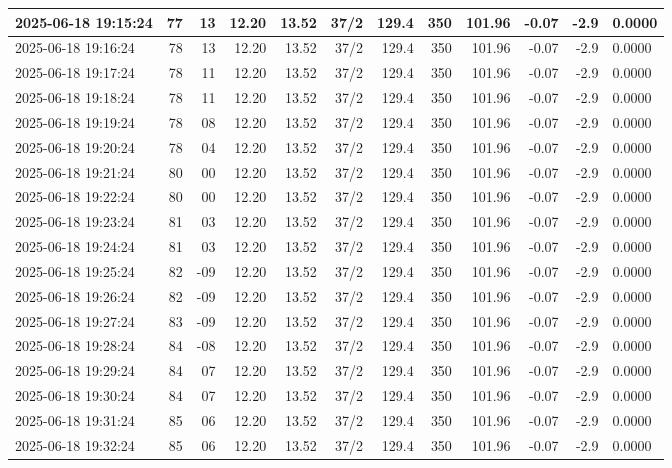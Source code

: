 \documentclass[UTF8,10pt,a4paper,fontset=fandol]{ctexart}
\begin{document}
{\begin{minipage}{0.96\textheight}
\begin{tabular}{|p{2.05cm}|r|r|r|r|r|r|r|r|r|r|p{2.0cm}|}
2025-06-18 19:15:24 & 77 & 13 & 12.20 & 13.52 & 37/2 & 129.4 & 350 & 101.96 & -0.07 & -2.9 & 0.0000 \\ \hline
2025-06-18 19:16:24 & 78 & 13 & 12.20 & 13.52 & 37/2 & 129.4 & 350 & 101.96 & -0.07 & -2.9 & 0.0000 \\ \hline
2025-06-18 19:17:24 & 78 & 11 & 12.20 & 13.52 & 37/2 & 129.4 & 350 & 101.96 & -0.07 & -2.9 & 0.0000 \\ \hline
2025-06-18 19:18:24 & 78 & 11 & 12.20 & 13.52 & 37/2 & 129.4 & 350 & 101.96 & -0.07 & -2.9 & 0.0000 \\ \hline
2025-06-18 19:19:24 & 78 & 08 & 12.20 & 13.52 & 37/2 & 129.4 & 350 & 101.96 & -0.07 & -2.9 & 0.0000 \\ \hline
2025-06-18 19:20:24 & 78 & 04 & 12.20 & 13.52 & 37/2 & 129.4 & 350 & 101.96 & -0.07 & -2.9 & 0.0000 \\ \hline
2025-06-18 19:21:24 & 80 & 00 & 12.20 & 13.52 & 37/2 & 129.4 & 350 & 101.96 & -0.07 & -2.9 & 0.0000 \\ \hline
2025-06-18 19:22:24 & 80 & 00 & 12.20 & 13.52 & 37/2 & 129.4 & 350 & 101.96 & -0.07 & -2.9 & 0.0000 \\ \hline
2025-06-18 19:23:24 & 81 & 03 & 12.20 & 13.52 & 37/2 & 129.4 & 350 & 101.96 & -0.07 & -2.9 & 0.0000 \\ \hline
2025-06-18 19:24:24 & 81 & 03 & 12.20 & 13.52 & 37/2 & 129.4 & 350 & 101.96 & -0.07 & -2.9 & 0.0000 \\ \hline
2025-06-18 19:25:24 & 82 & -09 & 12.20 & 13.52 & 37/2 & 129.4 & 350 & 101.96 & -0.07 & -2.9 & 0.0000 \\ \hline
2025-06-18 19:26:24 & 82 & -09 & 12.20 & 13.52 & 37/2 & 129.4 & 350 & 101.96 & -0.07 & -2.9 & 0.0000 \\ \hline
2025-06-18 19:27:24 & 83 & -09 & 12.20 & 13.52 & 37/2 & 129.4 & 350 & 101.96 & -0.07 & -2.9 & 0.0000 \\ \hline
2025-06-18 19:28:24 & 84 & -08 & 12.20 & 13.52 & 37/2 & 129.4 & 350 & 101.96 & -0.07 & -2.9 & 0.0000 \\ \hline
2025-06-18 19:29:24 & 84 & 07 & 12.20 & 13.52 & 37/2 & 129.4 & 350 & 101.96 & -0.07 & -2.9 & 0.0000 \\ \hline
2025-06-18 19:30:24 & 84 & 07 & 12.20 & 13.52 & 37/2 & 129.4 & 350 & 101.96 & -0.07 & -2.9 & 0.0000 \\ \hline
2025-06-18 19:31:24 & 85 & 06 & 12.20 & 13.52 & 37/2 & 129.4 & 350 & 101.96 & -0.07 & -2.9 & 0.0000 \\ \hline
2025-06-18 19:32:24 & 85 & 06 & 12.20 & 13.52 & 37/2 & 129.4 & 350 & 101.96 & -0.07 & -2.9 & 0.0000 \\ \hline

\end{tabular}
\end{minipage}}
\end{document}
